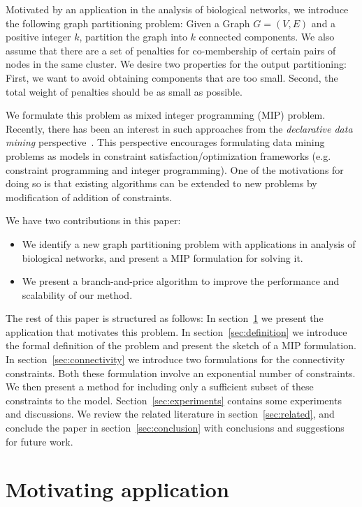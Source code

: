 \documentclass[conference,compsoc]{IEEEtran}
\begin{document}
Motivated by an application in the analysis of biological networks, we
introduce the following graph partitioning problem: Given a Graph
$G=(V, E)$ and a positive integer $k$, partition the graph into $k$
connected components. We also assume that there are a set of penalties
for co-membership of certain pairs of nodes in the same cluster. We
desire two properties for the output partitioning: First, we want to
avoid obtaining components that are too small. Second, the total
weight of penalties should be as small as possible.

We formulate this problem as mixed integer programming (MIP)
problem. Recently, there has been an interest in such
approaches from the \emph{declarative data mining}
perspective~\cite{DaoDV13}. This perspective encourages formulating
data mining problems as models in constraint satisfaction/optimization
frameworks (e.g. constraint programming and integer programming). One
of the motivations for doing so is that existing algorithms can be
extended to new problems by modification of addition of constraints.

We have two contributions in this paper:
\begin{itemize}
\item We identify a new graph partitioning problem with applications in analysis of biological networks, and present a MIP formulation for solving it. 
\item We present a branch-and-price algorithm to improve the performance and scalability of our method. 
\end{itemize}

The rest of this paper is structured as follows:  In
section~\ref{sec:motivation} we present the application that motivates
this problem.  In section~\ref{sec:definition} we introduce the formal
definition of the problem and present the sketch of a MIP formulation.
In section~\ref{sec:connectivity} we introduce two formulations for
the connectivity constraints. Both these formulation involve an
exponential number of constraints. We then present a method for
including only a sufficient subset of these constraints to the
model. Section~\ref{sec:experiments} contains some experiments and
discussions. We review the related literature in section~\ref{sec:related}, and conclude the paper in section~\ref{sec:conclusion} with conclusions and suggestions for future work.


\section{Motivating application}
\label{sec:motivation}
\end{document}
